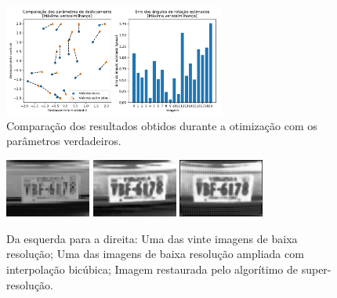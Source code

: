 \begin{figure}[h]
	\centering
	\caption{\label{fig:comparisson} Comparação dos resultados obtidos durante a otimização com os parâmetros verdadeiros.}
	\includegraphics[width=0.65\textwidth]{./figures/results_figures/comparisson_plot.pdf}
	
\end{figure}
\begin{figure}[h]
	\centering
	\caption{\label{fig:sr_comparisson} Da esquerda para a direita: Uma das vinte imagens de baixa resolução;
	Uma das imagens de baixa resolução ampliada com interpolação bicúbica;
	Imagem restaurada pelo algorítimo de super-resolução.}
	\includegraphics[width=0.25\textwidth]{./figures/results_figures/resized_nearest.png}
	\includegraphics[width=0.25\textwidth]{./figures/results_figures/bicubic_equalized.png}
	\includegraphics[width=0.25\textwidth]{./figures/results_figures/restored_image_sr.png}
\end{figure}

